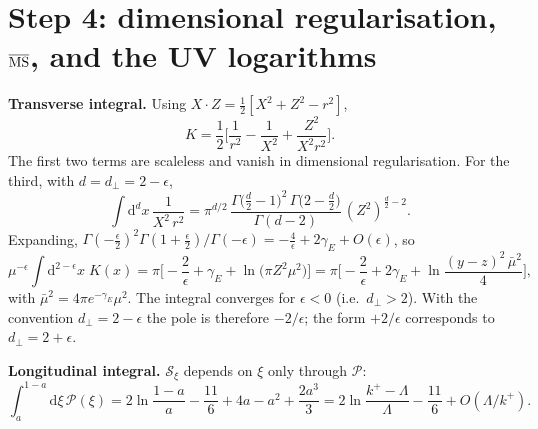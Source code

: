 \documentclass[11pt,a4paper]{article}
\newcommand{\dd}{\mathrm{d}}
\newcommand{\MSbar}{\overline{\rm MS}}
\newcommand{\mubar}{\bar\mu}
\begin{document}
\section{Step 4: dimensional regularisation, $\MSbar$, and the UV logarithms}
\textbf{Transverse integral.} Using $X\cdot Z=\tfrac12[X^2+Z^2-r^2]$,
\begin{equation}
K=\frac12\Big[\frac{1}{r^2}-\frac{1}{X^2}+\frac{Z^2}{X^2r^2}\Big].
\end{equation}
The first two terms are scaleless and vanish in dimensional regularisation. For the third, with
$d=d_\perp=2-\epsilon$,
\begin{equation}
\int\!\dd^{d}x\,\frac{1}{X^2\,r^2}=\pi^{d/2}\,
\frac{\Gamma\!\big(\tfrac d2-1\big)^2\,\Gamma\!\big(2-\tfrac d2\big)}{\Gamma(d-2)}\,(Z^2)^{\frac d2-2}.
\end{equation}
Expanding, $\Gamma(-\tfrac\epsilon2)^2\Gamma(1+\tfrac\epsilon2)/\Gamma(-\epsilon)=-\tfrac4\epsilon+2\gamma_E+O(\epsilon)$, so
\begin{equation}
\mu^{-\epsilon}\!\int\!\dd^{2-\epsilon}x\;K(x)
=\pi\Big[-\frac2\epsilon+\gamma_E+\ln\!\big(\pi Z^2\mu^2\big)\Big]
=\pi\Big[-\frac2\epsilon+2\gamma_E+\ln\frac{(y-z)^2\,\mubar^2}{4}\Big],
\label{eq:dimreg}
\end{equation}
with $\mubar^2=4\pi e^{-\gamma_E}\mu^2$.
The integral converges for $\epsilon<0$ (i.e.\ $d_\perp>2$). With the convention $d_\perp=2-\epsilon$ the
pole is therefore $-2/\epsilon$; the form $+2/\epsilon$ corresponds to $d_\perp=2+\epsilon$.

\textbf{Longitudinal integral.} $\mathcal S_\xi$ depends on $\xi$ only through $\mathcal P$:
\begin{equation}
\int_a^{1-a}\!\dd\xi\,\mathcal P(\xi)=2\ln\frac{1-a}{a}-\frac{11}{6}+4a-a^2+\frac{2a^3}{3}
=2\ln\frac{k^+-\Lambda}{\Lambda}-\frac{11}{6}+O(\Lambda/k^+).
\end{equation}
\end{document}
